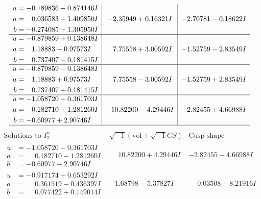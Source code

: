 \documentclass[1p]{elsarticle_modified}
\theoremstyle{definition}
\newcommand{\I}{\sqrt{-1}}
\begin{document}
$$\begin{array}{c|c|c}
\begin{aligned}
u &= -0.189836 - 0.874146 I \\
a &= \phantom{-}0.036583 + 1.409850 I \\
b &= -0.274085 + 1.305950 I\end{aligned}
 & -2.35949 + 0.16321 I & -2.70781 - 0.18622 I \\ \hline\begin{aligned}
u &= -0.879859 + 0.138648 I \\
a &= \phantom{-}1.18883 - 0.97573 I \\
b &= \phantom{-}0.737407 - 0.181415 I\end{aligned}
 & \phantom{-}7.75558 + 3.00592 I & -1.52759 - 2.83549 I \\ \hline\begin{aligned}
u &= -0.879859 - 0.138648 I \\
a &= \phantom{-}1.18883 + 0.97573 I \\
b &= \phantom{-}0.737407 + 0.181415 I\end{aligned}
 & \phantom{-}7.75558 - 3.00592 I & -1.52759 + 2.83549 I \\ \hline\begin{aligned}
u &= -1.058720 + 0.361703 I \\
a &= \phantom{-}0.182710 + 1.281260 I \\
b &= -0.60977 + 2.90746 I\end{aligned}
 & \phantom{-}10.82200 - 4.29446 I & -2.82455 + 4.66988 I\\
 \hline 
 \end{array}$$\newpage$$\begin{array}{c|c|c}  
\text{Solutions to }I^u_{2}& \I (\text{vol} + \sqrt{-1}CS) & \text{Cusp shape}\\
 \hline 
\begin{aligned}
u &= -1.058720 - 0.361703 I \\
a &= \phantom{-}0.182710 - 1.281260 I \\
b &= -0.60977 - 2.90746 I\end{aligned}
 & \phantom{-}10.82200 + 4.29446 I & -2.82455 - 4.66988 I \\ \hline\begin{aligned}
u &= -0.917174 + 0.653292 I \\
a &= \phantom{-}0.361519 - 0.436397 I \\
b &= \phantom{-}0.077422 + 0.149014 I\end{aligned}
 & -1.68798 - 5.37827 I & \phantom{-}0.03508 + 8.21916 I \\ \hline\begin{aligned}

\end{aligned}
\end{array}$$
\end{document}
